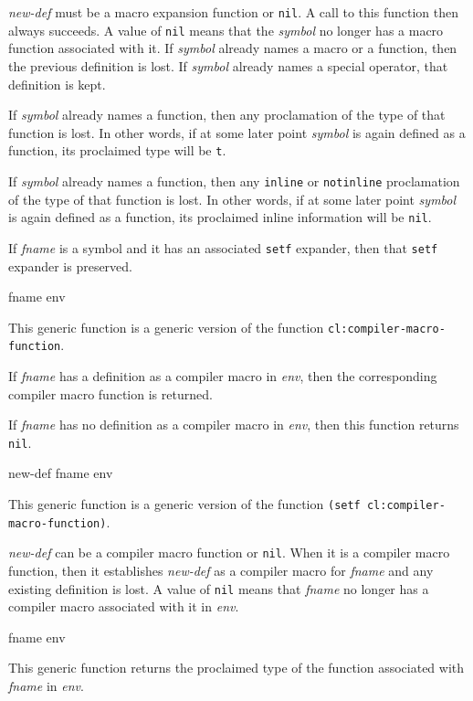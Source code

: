 \textit{new-def} must be a macro expansion function or \texttt{nil}.
A call to this function then always succeeds.  A value of \texttt{nil}
means that the \textit{symbol} no longer has a macro function
associated with it.  If \textit{symbol} already names a macro or a
function, then the previous definition is lost.  If \textit{symbol}
already names a special operator, that definition is kept.

If \textit{symbol} already names a function, then any proclamation of
the type of that function is lost.  In other words, if at some later
point \textit{symbol} is again defined as a function, its proclaimed
type will be \texttt{t}.

If \textit{symbol} already names a function, then any \texttt{inline} or
\texttt{notinline} proclamation of the type of that function is lost.  In other
words, if at some later point \textit{symbol} is again defined as a
function, its proclaimed inline information will be \texttt{nil}.

If \textit{fname} is a symbol and it has an associated \texttt{setf}
expander, then that \texttt{setf} expander is preserved.

 {fname env}

This generic function is a generic version of the \commonlisp{}
function \texttt{cl:compiler-macro-function}.

If \textit{fname} has a definition as a compiler macro in
\textit{env}, then the corresponding compiler macro function is
returned.

If \textit{fname} has no definition as a compiler macro in
\textit{env}, then this function returns \texttt{nil}.

 {new-def fname env}

This generic function is a generic version of the \commonlisp{}
function \texttt{(setf cl:compiler-macro-function)}.

\textit{new-def} can be a compiler macro function or \texttt{nil}.
When it is a compiler macro function, then it establishes
\textit{new-def} as a compiler macro for \textit{fname} and any
existing definition is lost.  A value of \texttt{nil} means that
\textit{fname} no longer has a compiler macro associated with it in
\textit{env}.

 {fname env}

This generic function returns the proclaimed type of the function
associated with \textit{fname} in \textit{env}.

